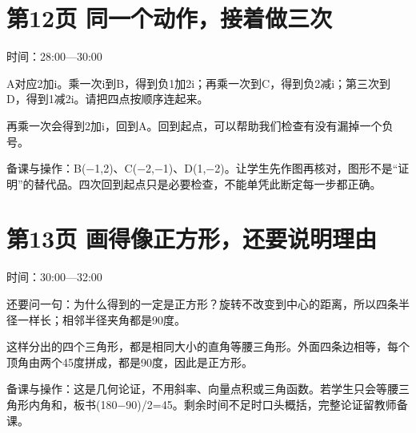 \documentclass[UTF8,a4paper,11pt,fontset=fandol]{ctexart}
\begin{document}
\par\noindent\begin{minipage}{\linewidth}

\section*{第12页 同一个动作，接着做三次}

时间：28:00—30:00

A对应2加i。乘一次i到B，得到负1加2i；再乘一次到C，得到负2减i；第三次到D，得到1减2i。请把四点按顺序连起来。

再乘一次会得到2加i，回到A。回到起点，可以帮助我们检查有没有漏掉一个负号。

{\small\color{black!65}备课与操作：B(−1,2)、C(−2,−1)、D(1,−2)。让学生先作图再核对，图形不是“证明”的替代品。四次回到起点只是必要检查，不能单凭此断定每一步都正确。}

\end{minipage}\par\vspace{3mm}

\par\noindent\begin{minipage}{\linewidth}

\section*{第13页 画得像正方形，还要说明理由}

时间：30:00—32:00

还要问一句：为什么得到的一定是正方形？旋转不改变到中心的距离，所以四条半径一样长；相邻半径夹角都是90度。

这样分出的四个三角形，都是相同大小的直角等腰三角形。外面四条边相等，每个顶角由两个45度拼成，都是90度，因此是正方形。

{\small\color{black!65}备课与操作：这是几何论证，不用斜率、向量点积或三角函数。若学生只会等腰三角形内角和，板书(180−90)/2=45。剩余时间不足时口头概括，完整论证留教师备课。}

\end{minipage}\par\vspace{3mm}
\end{document}
